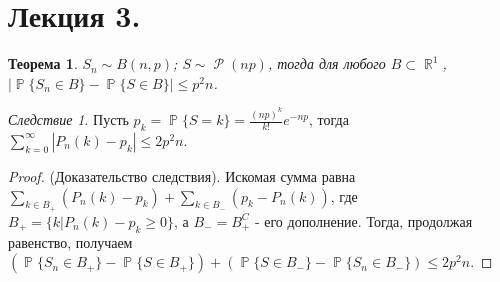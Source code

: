 \documentclass[a4paper,100pt]{article}
\theoremstyle{indented}
\newtheorem{theorem}{Теорема}
\theoremstyle{definition}
\theoremstyle{remark}
\newtheorem{cons}{Следствие}
\DeclareMathOperator{\RR}{\mathbb{R}}
\DeclareMathOperator{\PP}{\mathbb{P}}
\DeclareMathOperator{\Rho}{\mathcal{P}}
\begin{document}
\section{Лекция 3.}

\begin{theorem}
    $S_n\sim B(n, p)$; $S\sim \Rho(np)$, тогда для любого $B\subset \RR^1$, $|\PP\{S_n\in B\} - \PP\{S\in B\}|\leq p^2n$. 
\end{theorem}

\begin{cons}
    Пусть $p_k=\PP\{S=k\}=\frac{(np)^k}{k!}e^{-np}$, тогда $\sum_{k=0}^\infty |P_n(k)-p_k|\leq 2p^2n$.
\end{cons}

\begin{proof}
    (Доказательство следствия). Искомая сумма равна $\sum_{k\in B_+}(P_n(k)-p_k)+\sum_{k\in B_-}(p_k-P_n(k))$, где $B_+=\{k|P_n(k)-p_k\geq 0\}$, а $B_-=B_+^C$ - его дополнение. Тогда, продолжая равенство, получаем $(\PP\{S_n\in B_+\}-\PP\{S\in B_+\})+(\PP\{S\in B_-\}-\PP\{S_n\in B_-\})\leq 2p^2 n$.
\end{proof}
\end{document}
